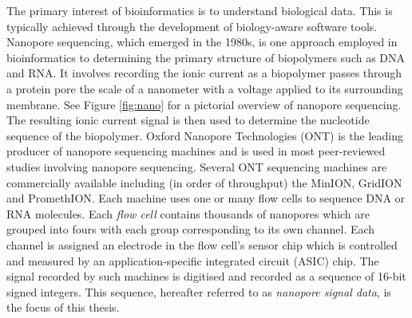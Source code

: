 The primary interest of bioinformatics is to understand biological data. This is typically achieved through the development of biology-aware software tools. Nanopore sequencing, which emerged in the 1980s, is one approach employed in bioinformatics to determining the primary structure of biopolymers such as DNA and RNA. It involves recording the ionic current as a biopolymer passes through a protein pore the scale of a nanometer with a voltage applied to its surrounding membrane. See Figure \ref{fig:nano} for a pictorial overview of nanopore sequencing. The resulting ionic current signal is then used to determine the nucleotide sequence of the biopolymer. Oxford Nanopore Technologies (ONT) is the leading producer of nanopore sequencing machines and is used in most peer-reviewed studies involving nanopore sequencing. Several ONT sequencing machines are commercially available including (in order of throughput) the MinION, GridION and PromethION.
Each machine uses one or many flow cells to sequence DNA or RNA molecules. Each \textit{flow cell} contains thousands of nanopores which are grouped into fours with each group corresponding to its own channel. Each channel is assigned an electrode in the flow cell's sensor chip which is controlled and measured by an application-specific integrated circuit (ASIC) chip.
The signal recorded by such machines is digitised and recorded as a sequence of 16-bit signed integers. This sequence, hereafter referred to as \textit{nanopore signal data}, is the focus of this thesis.


